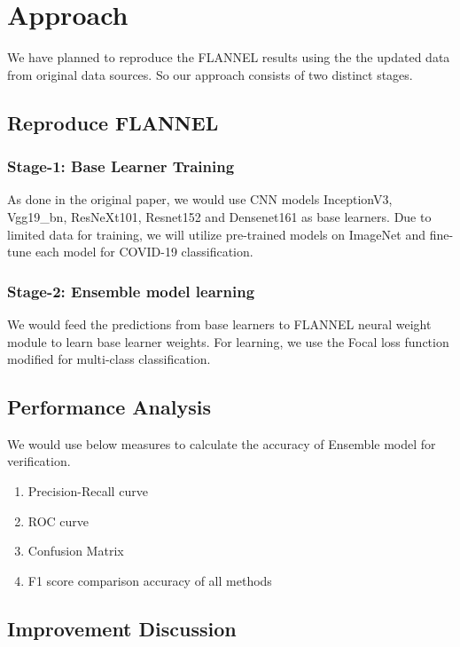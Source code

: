 \documentclass{sigkddExp}
\begin{document}
\section{Approach}

We have planned to reproduce the FLANNEL results using the the updated data
from original data sources. So our approach consists of two distinct stages.

\subsection{Reproduce FLANNEL}

\subsubsection{Stage-1: Base Learner Training}

As done in the original paper, we would use CNN models InceptionV3, Vgg19\_bn,
ResNeXt101, Resnet152 and Densenet161 as base learners. Due to limited data for
training, we will utilize pre-trained models on ImageNet and fine-tune each
model for COVID-19 classification.

\subsubsection{Stage-2: Ensemble model learning}
We would feed the predictions from base learners to FLANNEL neural weight module
to learn base learner weights. For learning, we use the Focal loss function modified
for multi-class classification.

\subsection{Performance Analysis}
We would use below measures to calculate the accuracy of Ensemble model for verification.

\begin{enumerate}
    \item Precision-Recall curve
    \item ROC curve
    \item Confusion Matrix
    \item F1 score comparison accuracy of all methods
\end{enumerate}



\subsection{Improvement Discussion}
\end{document}
